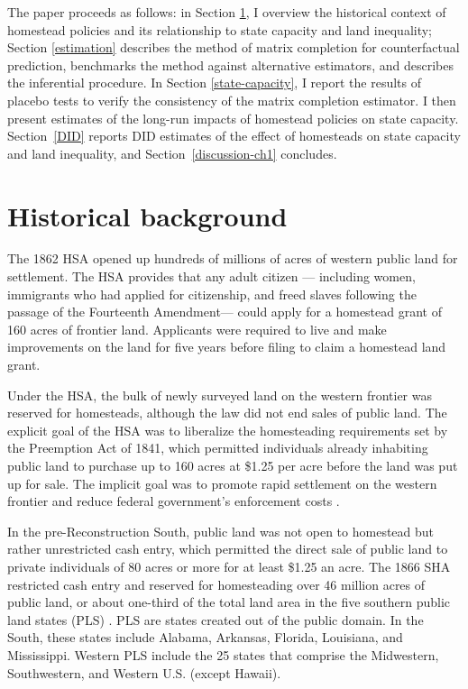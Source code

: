 The paper proceeds as follows: in Section \ref{history-ch1}, I overview the historical context of homestead policies and its relationship to state capacity and land inequality; Section \ref{estimation} describes the method of matrix completion for counterfactual prediction, benchmarks the method against alternative estimators, and describes the inferential procedure. In Section \ref{state-capacity}, I report the results of placebo tests to verify the consistency of the matrix completion estimator. I then present estimates of the long-run impacts of homestead policies on state capacity. Section~\ref{DID} reports DID estimates of the effect of homesteads on state capacity and land inequality, and Section~\ref{discussion-ch1} concludes. 

\section{Historical background} \label{history-ch1}

The 1862 HSA opened up hundreds of millions of acres of western public land for settlement. The HSA provides that any adult citizen --- including women, immigrants who had applied for citizenship, and freed slaves following the passage of the Fourteenth Amendment---  could apply for a homestead grant of 160 acres of frontier land. Applicants were required to live and make improvements on the land for five years before filing to claim a homestead land grant. 

Under the HSA, the bulk of newly surveyed land on the western frontier was reserved for homesteads, although the law did not end sales of public land. The explicit goal of the HSA was to liberalize the homesteading requirements set by the Preemption Act of 1841, which permitted individuals already inhabiting public land to purchase up to 160 acres at \$1.25 per acre before the land was put up for sale. The implicit goal was to promote rapid settlement on the western frontier and reduce federal government's enforcement costs \citep{allen1991homesteading}. 

In the pre-Reconstruction South, public land was not open to homestead but rather unrestricted cash entry, which permitted the direct sale of public land to private individuals of 80 acres or more for at least \$1.25 an acre. The 1866 SHA restricted cash entry and reserved for homesteading over 46 million acres of public land, or about one-third of the total land area in the five southern public land states (PLS) \citep[pp. 13]{lanza1999agrarianism}. PLS are states created out of the public domain. In the South, these states include Alabama, Arkansas, Florida, Louisiana, and Mississippi. Western PLS include the 25 states that comprise the Midwestern, Southwestern, and Western U.S. (except Hawaii). 

